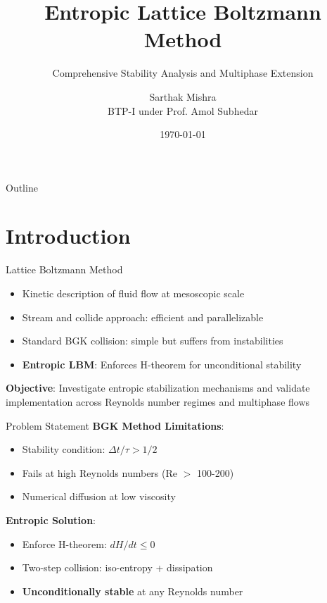 \documentclass[aspectratio=169]{beamer}
\title{Entropic Lattice Boltzmann Method}
\subtitle{Comprehensive Stability Analysis and Multiphase Extension}
\author{Sarthak Mishra \\ BTP-I under Prof. Amol Subhedar}
\date{\today}
\begin{document}
\frame{\titlepage}

\begin{frame}{Outline}
\tableofcontents
\end{frame}

\section{Introduction}

\begin{frame}{Lattice Boltzmann Method}
\begin{itemize}
    \item Kinetic description of fluid flow at mesoscopic scale
    \item Stream and collide approach: efficient and parallelizable
    \item Standard BGK collision: simple but suffers from instabilities
    \item \textbf{Entropic LBM}: Enforces H-theorem for unconditional stability
\end{itemize}

\vspace{0.5cm}
\textbf{Objective}: Investigate entropic stabilization mechanisms and validate implementation across Reynolds number regimes and multiphase flows
\end{frame}

\begin{frame}{Problem Statement}
\textbf{BGK Method Limitations}:
\begin{itemize}
    \item Stability condition: $\Delta t / \tau > 1/2$
    \item Fails at high Reynolds numbers (Re $>$ 100-200)
    \item Numerical diffusion at low viscosity
\end{itemize}

\vspace{0.5cm}
\textbf{Entropic Solution}:
\begin{itemize}
    \item Enforce H-theorem: $dH/dt \leq 0$
    \item Two-step collision: iso-entropy + dissipation
    \item \textbf{Unconditionally stable} at any Reynolds number
\end{itemize}
\end{frame}

\end{document}
